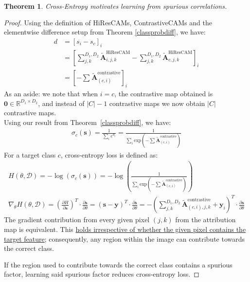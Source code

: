 \documentclass{article}
\theoremstyle{plain}
\newtheorem{theorem}{Theorem}[section]
\theoremstyle{definition}
\theoremstyle{remark}
\begin{document}
\begin{theorem}\label{ce-spur-corr}
	Cross-Entropy motivates learning from spurious correlations.
\end{theorem}
\begin{proof} Using the definition of HiResCAMs, ContrastiveCAMs and the elementwise difference setup from Theorem \ref{classprobdiff}, we have:
	\begin{align}
		d &= [s_i - s_c]_i \\
		&= \left[\sum^{D_1,D_2}_{j,k} \tilde{\mathcal{\bm{A}}}_{i,j,k}^{\text{HiResCAM}} - \sum^{D_1,D_2}_{j,k} \tilde{\mathcal{\bm{A}}}_{c,j,k}^{\text{HiResCAM}}\right]_i \\
		&= \left[ -\sum^{}\tilde{\mathcal{\bm{A}}}^{\text{contrastive}}_{(c, i)} \right]_i
	\end{align}
	As an aside: we note that when $i = c$, the contrastive map obtained is $\bm{0} \in \mathbb{R}^{D_1 \times D_2}$, and instead of $|C| - 1$ contrastive maps we now obtain $|C|$ contrastive maps. \newline \\
	Using our result from Theorem~\ref{classprobdiff}, we have:
	\begin{gather}
		\sigma_c(\bm{s}) = \frac{1}{\sum_i e^{d_i}} = \frac{1}{\sum_i \text{exp}({-\sum^{}\tilde{\mathcal{\bm{A}}}^{\text{contrastive}}_{(c, i)}})}
	\end{gather}
	For a target class $c$, cross-entropy loss is defined as:
	\begin{gather}
		H(\theta, \mathcal{D}) = -\log \left( \sigma_c(\bm{s}) \right) = -\log \left( \frac{1}{\sum_i \text{exp}({-\sum^{}\tilde{\mathcal{\bm{A}}}^{\text{contrastive}}_{(c, i)}})} \right) \\
		\nabla_\theta H(\theta, \mathcal{D}) = \left(\frac{\partial H}{\partial \bm{s}}\right)^T \cdot \frac{\partial \bm{s}}{\partial \theta} = (\bm{s} - \bm{y})^T \cdot \frac{\partial \bm{s}}{\partial \theta} = -\left(\sum^{D_1, D_2}_{j,k} \tilde{\mathcal{\bm{A}}}_{(c, i), j, k}^{\text{contrastive}} + \bm{y}_{i}\right)^T \cdot \frac{\partial \bm{s}}{\partial \theta}
	\end{gather}
	The gradient contribution from every given pixel $(j, k)$ from the attribution map is equivalent. This \underline{holds irrespective of whether the given pixel contains the target feature}; consequently, any region within the image can contribute towards the correct class.

	If the region used to contribute towards the correct class contains a spurious factor, learning said spurious factor reduces cross-entropy loss.
\end{proof}
\end{document}
